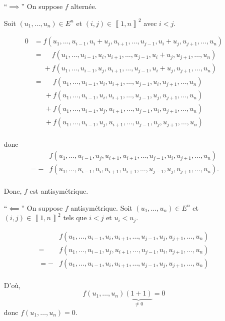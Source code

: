 \begin{prv}
	\begin{itemize}
		\item[``$\implies$''] On suppose $f$ alternée.

			Soit $(u_1, \ldots, u_n) \in E^n$ et $(i,j) \in \left\llbracket 1,n \right\rrbracket^2$ avec $i < j$.

			\begin{align*}
				0 &= f(u_1, \ldots, u_{i-1}, u_i + u_j, u_{i+1}, \ldots, u_{j-1}, u_i + u_j, u_{j+1}, \ldots, u_n)\\
				&=\phantom{+} f(u_1, \ldots, u_{i-1}, u_i, u_{i+1}, \ldots, u_{j-1}, u_i + u_j, u_{j+1},\ldots, u_n) \\
				&\phantom{=}+f(u_1, \ldots, u_{i-1}, u_j, u_{i+1}, \ldots, u_{j-1}, u_i + u_j, u_{j+1}, \ldots, u_n)\\
				&=\,\phantom{+} f(u_1, \ldots, u_{i-1}, u_i, u_{i+1}, \ldots, u_{j-1}, u_i, u_{j+1}, \ldots, u_n) \\
				&\phantom{=}\, + f(u_1, \ldots, u_{i-1}, u_i, u_{i+1}, \ldots, u_{j-1}, u_j, u_{j+1}, \ldots, u_n)\\
				&\phantom{=}\, + f(u_1, \ldots, u_{i-1}, u_j, u_{i+1}, \ldots, u_{j-1}, u_i, u_{j+1}, \ldots, u_n)\\
				&\phantom{=}\, + f(u_1, \ldots, u_{i-1}, u_j, u_{i+1}, \ldots, u_{j-1}, u_j, u_{j+1}, \ldots, u_n)\\
			\end{align*}

			donc
			\begin{align*}
				&f(u_1, \ldots, u_{i-1}, u_j, u_{i+1}, u_{i+1}, \ldots, u_{j-1}, u_i, u_{j+1}, \ldots, u_n)\\
				=-&f(u_1, \ldots, u_{i-1}, u_i, u_{i+1}, u_{i+1}, \ldots, u_{j-1}, u_j, u_{j+1}, \ldots, u_n).\\
			\end{align*}

			Donc, $f$ est antisymétrique.
		\item[``$\impliedby$''] On suppose $f$ antisymétrique.
			Soit $(u_1, \ldots, u_n) \in E^n$ et $(i,j) \in \left\llbracket 1,n \right\rrbracket^2$ tels que $i<j$ et $u_i < u_j$.

			\begin{align*}
				&f(u_1, \ldots, u_{i-1}, u_i, u_{i+1}, \ldots, u_{j-1}, u_j, u_{j+1}, \ldots, u_n)\\
				=&f(u_1, \ldots, u_{i-1}, u_j, u_{i+1}, \ldots, u_{j-1}, u_i, u_{j+1}, \ldots, u_n)\\
				=-&f(u_1, \ldots, u_{i-1}, u_i, u_{i+1}, \ldots, u_{j-1}, u_j, u_{j+1}, \ldots, u_n)\\
			\end{align*}

			D'où, \[
				f(u_1, \ldots, u_n)\underbrace{(1+1)}_{\neq 0} = 0
			\] donc $f(u_1, \ldots, u_n) = 0$.
	\end{itemize}
\end{prv}

